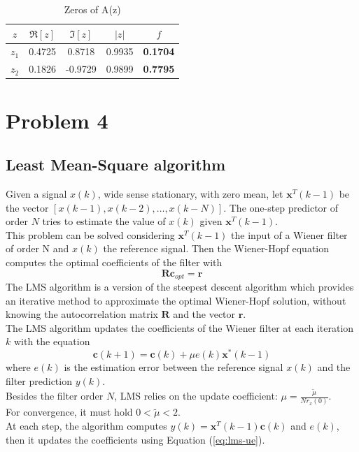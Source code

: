 \documentclass[a4paper, 12pt]{report}
\begin{document}
\begin{table}[H]
\centering
\begin{tabular}{ccccc}
\toprule
$z$		& $\Re[z]$ 	& $\Im[z]$			& $|z|$			& $f$ \\
\midrule
$z_1$ 	& 0.4725	& 0.8718			& 0.9935		& {\bf 0.1704} \\
$z_2$	& 0.1826	& -0.9729			& 0.9899		& {\bf 0.7795} \\
\bottomrule
\end{tabular}
\caption{Zeros of A(z)}
\label{tab:errpred}
\end{table}


\section*{Problem 4}

\subsection*{Least Mean-Square algorithm}
Given a signal $x(k)$, wide sense stationary, with zero mean, let $\mathbf{x}^T(k-1)$ be the vector $[x(k-1), x(k-2), \dots, x(k-N)]$. The one-step predictor of order $N$ tries to estimate the value of $x(k)$ given $\mathbf{x}^T(k-1)$.\\
This problem can be solved considering $\mathbf{x}^T(k-1)$ the input of a Wiener filter of order N and $x(k)$ the reference signal. Then the Wiener-Hopf equation computes the optimal coefficients of the filter with
\begin{equation}
	\mathbf{R} \mathbf{c}_{opt} = \mathbf{r}
\end{equation}
The LMS algorithm is a version of the steepest descent algorithm which provides an iterative method to approximate the optimal Wiener-Hopf solution, without knowing the autocorrelation matrix $\mathbf{R}$ and the vector $\mathbf{r}$.\\
The LMS algorithm updates the coefficients of the Wiener filter at each iteration $k$ with the equation
\begin{equation}\label{eq:lms-ue}
	\mathbf{c}(k+1) = \mathbf{c}(k) + \mu e(k) \mathbf{x}^*(k-1)
\end{equation}
where $e(k)$ is the estimation error between the reference signal $x(k)$ and the filter prediction $y(k)$.\\
Besides the filter order $N$, LMS relies on the update coefficient: $\mu = \frac{\tilde{\mu}}{N r_x(0)}$.\\
For convergence, it must hold $0 < \tilde{\mu} < 2$.\\
At each step, the algorithm computes $ y(k) = \mathbf{x}^T(k-1) \mathbf{c}(k)$ and $e(k)$, then it updates the coefficients using Equation (\ref{eq:lms-ue}).
\end{document}
